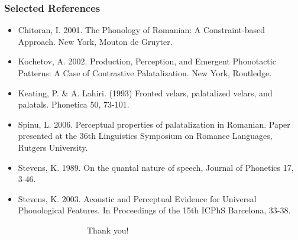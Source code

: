 \documentclass[noamsthm]{beamer}
\begin{document}
\begin{frame}[shrink=5]
\frametitle{Selected References}
\begin{itemize}
\item Chitoran, I. 2001. The Phonology of Romanian: A Constraint-based Approach. New York, Mouton de Gruyter.
\item Kochetov, A. 2002. Production, Perception, and Emergent Phonotactic Patterns: A Case of Contrastive Palatalization.
New York, Routledge.
\item Keating, P. \& A. Lahiri. (1993) Fronted velars, palatalized velars, and palatals. Phonetica 50, 73-101.
\item Spinu, L. 2006. Perceptual properties of palatalization in Romanian. Paper presented at the 36th Linguistics
Symposium on Romance Languages, Rutgers University.
\item Stevens, K. 1989. On the quantal nature of speech, Journal of 
Phonetics 17, 3-46.
\item Stevens, K. 2003. Acoustic and Perceptual Evidence for Universal Phonological Features. In Proceedings of the 15th
ICPhS Barcelona, 33-38.
\end{itemize}

\end{frame}

\begin{frame}
~~~~~~~~~~~~~~~~~~~~Thank you!
\end{frame}
\end{document}
